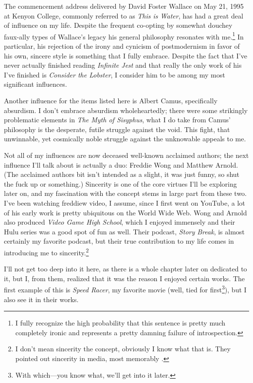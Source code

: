 \documentclass[../philo.tex]{subfiles}
\begin{document}
The commencement address delivered by David Foster Wallace on May 21, 1995 at Kenyon College, commonly referred to as \textit{This is Water}, has had a great deal of influence on my life.
Despite the frequent co-opting by somewhat douchey faux-ally types of Wallace's legacy his general philosophy resonates with me.\footnote{I fully recognize the high probability that this sentence is pretty much completely ironic and represents a pretty damning failure of introspection.}
In particular, his rejection of the irony and cynicism of postmodernism in favor of his own, sincere style is something that I fully embrace.
Despite the fact that I've never actually finished reading \textit{Infinite Jest} and that really the only work of his I've finished is \textit{Consider the Lobster}, I consider him to be among my most significant influences.


Another influence for the items listed here is Albert Camus, specifically absurdism.
I don't embrace absurdism wholeheartedly; there were some strikingly problematic elements in \textit{The Myth of Sisyphus}, what I do take from Camus' philosophy is the desperate, futile struggle against the void.
This fight, that unwinnable, yet cosmically noble struggle against the unknowable appeals to me.

Not all of my influences are now deceased well-known acclaimed authors; the next influence I'll talk about is actually a duo: Freddie Wong and Matthew Arnold.
(The acclaimed authors bit isn't intended as a slight, it was just funny, so shut the fuck up or something.)
Sincerity is one of the core virtues I'll be exploring later on, and my fascination with the concept stems in large part from these two.
I've been watching freddiew video, I assume, since I first went on YouTube, a lot of his early work is pretty ubiquitous on the World Wide Web.
Wong and Arnold also produced \textit{Video Game High School}, which I enjoyed immensely and their Hulu series was a good spot of fun as well.
Their podcast, \textit{Story Break}, is almost certainly my favorite podcast, but their true contribution to my life comes in introducing me to sincerity.\footnote{I don't mean sincerity the concept, obviously I know what that is. They pointed out sincerity in media, most memorably .}

I'll not get too deep into it here, as there is a whole chapter later on dedicated to it, but I, from them, realized that it was the reason I enjoyed certain works.
The first example of this is \textit{Speed Racer}, my favorite movie (well, tied for first\footnote{With  which---you know what, we'll get into it later.}), but I also see it in their works.
\end{document}
